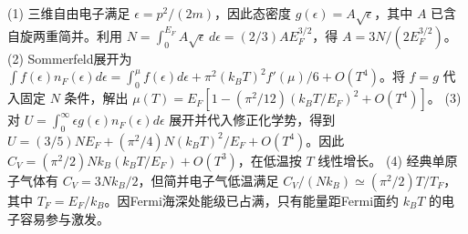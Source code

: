 (1) 三维自由电子满足 \(\epsilon=p^2/(2m)\)，因此态密度 \(g(\epsilon)=A\sqrt{\epsilon}\)，其中 \(A\) 已含自旋两重简并。利用 \(N=\int_0^{E_F}A\sqrt\epsilon\,d\epsilon=(2/3)AE_F^{3/2}\)，得 \(A=3N/(2E_F^{3/2})\)。
(2) Sommerfeld展开为 \(\int f(\epsilon)n_F(\epsilon)d\epsilon=\int_0^\mu f(\epsilon)d\epsilon+\pi^2(k_BT)^2f'(\mu)/6+O(T^4)\)。将 \(f=g\) 代入固定 \(N\) 条件，解出 \(\mu(T)=E_F[1-(\pi^2/12)(k_BT/E_F)^2+O(T^4)]\)。
(3) 对 \(U=\int_0^\infty\epsilon g(\epsilon)n_F(\epsilon)d\epsilon\) 展开并代入修正化学势，得到 \(U=(3/5)NE_F+(\pi^2/4)N(k_BT)^2/E_F+O(T^4)\)。因此 \(C_V=(\pi^2/2)Nk_B(k_BT/E_F)+O(T^3)\)，在低温按 \(T\) 线性增长。
(4) 经典单原子气体有 \(C_V=3Nk_B/2\)，但简并电子气低温满足 \(C_V/(Nk_B)\simeq(\pi^2/2)T/T_F\)，其中 \(T_F=E_F/k_B\)。因Fermi海深处能级已占满，只有能量距Fermi面约 \(k_BT\) 的电子容易参与激发。

